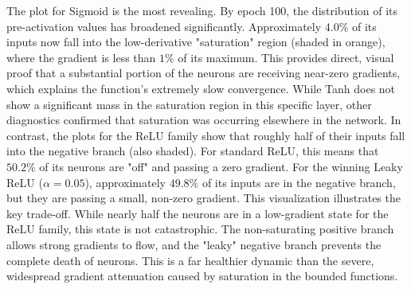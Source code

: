 \newpage
The plot for Sigmoid is the most revealing. By epoch 100, the distribution of its pre-activation values has broadened significantly. Approximately $4.0\%$ of its inputs now fall into the low-derivative "saturation" region (shaded in orange), where the gradient is less than $1\%$ of its maximum. This provides direct, visual proof that a substantial portion of the neurons are receiving near-zero gradients, which explains the function's extremely slow convergence. While Tanh does not show a significant mass in the saturation region in this specific layer, other diagnostics confirmed that saturation was occurring elsewhere in the network. In contrast, the plots for the ReLU family show that roughly half of their inputs fall into the negative branch (also shaded). For standard ReLU, this means that $50.2\%$ of its neurons are "off" and passing a zero gradient. For the winning Leaky ReLU ($\alpha=0.05$), approximately $49.8\%$ of its inputs are in the negative branch, but they are passing a small, non-zero gradient. This visualization illustrates the key trade-off. While nearly half the neurons are in a low-gradient state for the ReLU family, this state is not catastrophic. The non-saturating positive branch allows strong gradients to flow, and the "leaky" negative branch prevents the complete death of neurons. This is a far healthier dynamic than the severe, widespread gradient attenuation caused by saturation in the bounded functions.\\



